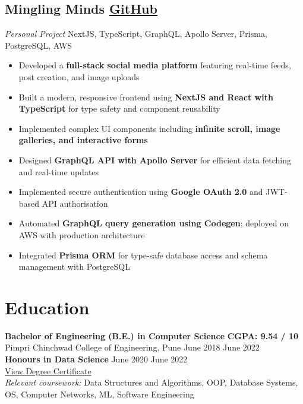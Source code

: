 \documentclass[a4paper,11.5pt]{article}
\newcommand{\h}[1]{\textbf{\textcolor{hgray}{#1}}}
\begin{document}
\subsection*{Mingling Minds \hfill \href{https://github.com/sakshi-suryawanshi/MinglingMinds}{GitHub}}
\textit{Personal Project} \textbar{} NextJS, TypeScript, GraphQL, Apollo Server, Prisma, PostgreSQL, AWS
\begin{itemize}[topsep=2pt]
  \item Developed a \h{full-stack social media platform} featuring real-time feeds, post creation, and image uploads
  \item Built a modern, responsive frontend using \h{NextJS and React with TypeScript} for type safety and component reusability
  \item Implemented complex UI components including \h{infinite scroll, image galleries, and interactive forms}
  \item Designed \h{GraphQL API with Apollo Server} for efficient data fetching and real-time updates
  \item Implemented secure authentication using \h{Google OAuth 2.0} and JWT-based API authorisation
  \item Automated \h{GraphQL query generation using Codegen}; deployed on AWS with production architecture
  \item Integrated \h{Prisma ORM} for type-safe database access and schema management with PostgreSQL
\end{itemize}

\vspace{0.4em}

\section*{Education}
\textbf{Bachelor of Engineering (B.E.) in Computer Science} \hfill \textbf{CGPA: 9.54 / 10}\\
Pimpri Chinchwad College of Engineering, Pune \hfill June 2018 \textendash{} June 2022\\[0.12em]
\textbf{Honours in Data Science} \hfill June 2020 \textendash{} June 2022\\[0.08em]
\href{https://drive.google.com/file/d/1pRByI4wXkzrAlU01gC_9LvlRlEBMOAma/view?usp=drive_link}{View Degree Certificate}\\[0.08em]
\textit{Relevant coursework:} Data Structures and Algorithms, OOP, Database Systems, OS, Computer Networks, ML, Software Engineering
\end{document}

